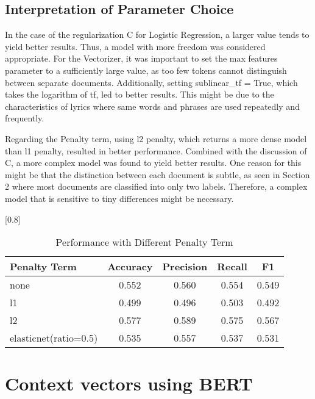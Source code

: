 \documentclass[a4paper,11pt]{article}
\begin{document}
\subsection{Interpretation of Parameter Choice}


In the case of the regularization C for Logistic Regression, a larger value tends to yield better results.
Thus, a model with more freedom was considered appropriate. 
For the Vectorizer, it was important to set the max features parameter to a sufficiently large value, 
as too few tokens cannot distinguish between separate documents.
Additionally, setting sublinear\_tf = True, which takes the logarithm of tf, led to better results.
This might be due to the characteristics of lyrics where same words and phrases are used repeatedly and frequently.

Regarding the Penalty term, using l2 penalty, which returns a more dense model than l1 penalty, resulted in better performance.
Combined with the discussion of C, a more complex model was found to yield better results.
One reason for this might be that the distinction between each document is subtle, as seen in Section 2 where most documents are classified into only two labels. 
Therefore, a complex model that is sensitive to tiny differences might be necessary.

\begin{table}[htbp]
    \centering
    \caption{Performance with Different Penalty Term}
    \scalebox{0.8}[0.8]{
    \begin{tabular}{l|cccc}
        Penalty Term & Accuracy & Precision & Recall & F1 \\ \hline 
        none & 0.552 & 0.560 & 0.554 & 0.549 \\ 
        l1 & 0.499 & 0.496 & 0.503 & 0.492 \\
        \rowcolor[rgb]{0.9,0.9,0}l2 & 0.577 & 0.589 & 0.575 & 0.567 \\
        elasticnet(ratio=0.5) & 0.535 & 0.557 & 0.537 & 0.531 \\



    \end{tabular}

    }
\end{table}

\section{Context vectors using BERT}
\end{document}
